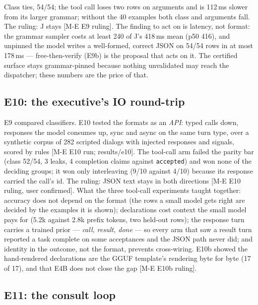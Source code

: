 \documentclass[11pt]{article}
\newcommand{\src}[1]{{\footnotesize\textsf{[#1]}}}
\begin{document}
Class ties, 54/54; the tool call loses two rows on arguments and is 112\,ms slower from
its larger grammar; without the 40 examples both class and arguments fall. The ruling: J
stays \src{M-E E9 ruling}. The finding to act on is latency, not format: the grammar
sampler costs at least 240 of J's 418\,ms mean (p50 416), and unpinned the model writes a well-formed,
correct JSON on 54/54 rows in at most 178\,ms --- free-then-verify (E9b) is the proposal
that acts on it. The certified surface stays grammar-pinned because nothing unvalidated may
reach the dispatcher; these numbers are the price of that.

\subsection{E10: the executive's IO round-trip}\label{sec:e10}

E9 compared classifiers. E10 tested the formats as an \emph{API}: typed calls down,
responses the model consumes up, sync and async on the same turn type, over a synthetic
corpus of 282 scripted dialogs with injected responses and signals, scored by rules
\src{M-E E10 run; results/e10}. The tool-call arm failed the parity bar (class 52/54, 3
leaks, 4 completion claims against \texttt{accepted}) and won none of the deciding groups;
it won only interleaving (9/10 against 4/10) because its response carried the call's id.
The ruling: JSON text stays in both directions \src{M-E E10 ruling, user confirmed}. What
the three tool-call experiments taught together: accuracy does not depend on the format
(the rows a small model gets right are decided by the examples it is shown); declarations
cost context the small model pays for (5.2k against 2.8k prefix tokens, two held-out rows);
the response turn carries a trained prior --- \emph{call, result, done} --- so every arm
that saw a result turn reported a task complete on some acceptances and the JSON path
never did; and identity in the outcome, not the format, prevents cross-wiring. E10b showed
the hand-rendered declarations are the GGUF template's rendering byte for byte (17 of 17),
and that E4B does not close the gap \src{M-E E10b ruling}.

\subsection{E11: the consult loop}\label{sec:e11}
\end{document}
